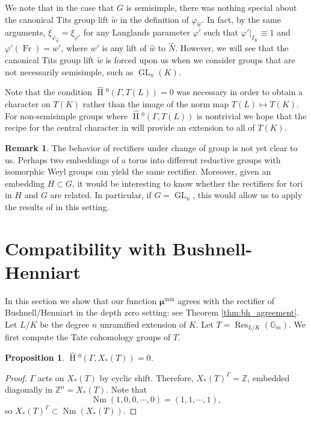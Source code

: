 \documentclass[11pt]{amsart}
\theoremstyle{plain}
\newtheorem{proposition}[theorem]{Proposition}
\newcommand{\HT}[1]{\hat{\HH}{}^{#1}}
\theoremstyle{definition}
\newtheorem{remark}[theorem]{Remark}
\DeclareMathOperator{\HH}{H}
\DeclareMathOperator{\Nm}{Nm}
\DeclareMathOperator{\Res}{Res}
\DeclareMathOperator{\Fr}{Fr}
\DeclareMathOperator{\GL}{GL}
\newcommand{\Gm}{\mathbb{G}_m}
\newcommand{\bmu}{\boldsymbol\mu}
\newcommand{\mumin}{\bmu^{\min}}
\begin{document}
We note that in the
case that $G$ is semisimple, there was nothing special about
the canonical Tits group lift $\tilde{w}$ in the definition of $\varphi_{\hat{w}}$.
In fact, by the same arguments, $\xi_{\varphi_{\hat{w}}} = \xi_{\varphi'}$
for any Langlands parameter $\varphi'$ such that $\varphi'|_{I_K} \equiv 1$
and $\varphi'(\Fr) = w'$, where $w'$ is any lift of $\hat{w}$ to $\hat{N}$.
However, we will see that the canonical Tits group lift $\tilde{w}$ is forced upon us when we
consider groups that are not necessarily semisimple, such as $\GL_{n}(K)$.

Note that the condition $\HT{0}(\Gamma, T(L)) = 0$ was necessary in order to obtain a character on $T(K)$ rather
than the image of the norm map $T(L) \mapsto T(K)$.  For non-semisimple groups where $\HT{0}(\Gamma, T(L))$
is nontrivial we hope that the recipe for the central character in \cite{gross-reeder:09a} will provide an extension to all of $T(K)$.

\begin{remark}
The behavior of rectifiers under change of group is not yet clear to us.  Perhaps two embeddings of a torus into
different reductive groups with isomorphic Weyl groups can yield the same rectifier.  Moreover, given an embedding
$H \subset G$, it would be interesting to know whether the rectifiers for tori in $H$ and $G$ are related.  In particular, if $G = \GL_n$, this would allow us to apply the results of \cite{bushnell-henniart:10a} in this setting.
\end{remark}

\section{Compatibility with Bushnell-Henniart} \label{section:BH_compat}

In this section we show that our function $\mumin$
agrees with the rectifier of Bushnell/Henniart in the depth
zero setting: see Theorem \ref{thm:bh_agreement}.
Let $L/K$ be the degree $n$ unramified extension of $K$.
Let $T = \Res_{L/K}(\Gm)$.  We first compute the Tate cohomology groups of $T$.

\begin{proposition}
$\HT{0}(\Gamma, X_*(T)) = 0$.
\end{proposition}

\begin{proof}
$\Gamma$ acts on $X_*(T)$ by cyclic shift.
Therefore, $X_*(T)^{\Gamma} = \mathbb{Z}$, embedded diagonally in
$\mathbb{Z}^n = X_*(T)$.  Note that $$\Nm(1,0,0,\cdots,0) = (1,1,\cdots,1),$$ so
$X_*(T)^{\Gamma} \subset \Nm(X_*(T))$.
\end{proof}
\end{document}
